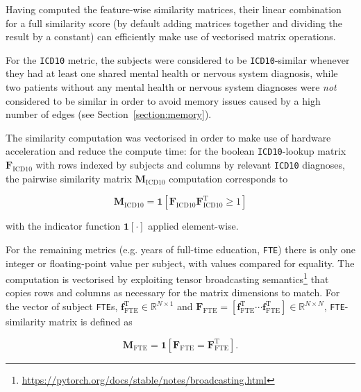 Having computed the feature-wise similarity matrices, their linear combination for a full similarity score (by default adding matrices together and dividing the result by a constant) can efficiently make use of vectorised matrix operations.

For the \texttt{ICD10} metric, the subjects were considered to be \texttt{ICD10}-similar whenever they had at least one shared mental health or nervous system diagnosis, while two patients without any mental health or nervous system diagnoses were \textit{not} considered to be similar in order to avoid memory issues caused by a high number of edges (see Section~\ref{section:memory}). 

The similarity computation was vectorised in order to make use of hardware acceleration and reduce the compute time: for the boolean \texttt{ICD10}-lookup matrix $\mathbf{F}_{\text{ICD10}}$ with rows indexed by subjects and columns by relevant \texttt{ICD10} diagnoses, the pairwise similarity matrix $\mathbf{M}_{\text{ICD10}}$ computation corresponds to 

\begin{equation}
    \mathbf{M}_{\text{ICD10}} = \mathbf{1}\left[\mathbf{F}_{\text{ICD10}}^{\ }\mathbf{F}_{\text{ICD10}}^{\mathrm{T}} \geq 1\right]
\end{equation}

with the indicator function $\mathbf{1}[\cdot]$ applied element-wise.

For the remaining metrics (e.g. years of full-time education, \texttt{FTE}) there is only one integer or floating-point value per subject, with values  compared for equality. The computation is vectorised by exploiting tensor broadcasting semantics\footnote{\url{https://pytorch.org/docs/stable/notes/broadcasting.html}} that copies rows and columns as necessary for the matrix dimensions to match. For the vector of subject \texttt{FTE}s, $\mathbf{f}_{\text{FTE}}^{\mathrm{T}} \in \mathbb{R}^{N \times 1}$ and $\mathbf{F}_{\text{FTE}} = [\mathbf{f}_{\text{FTE}}^{\mathrm{T}} \cdots \mathbf{f}_{\text{FTE}}^{\mathrm{T}}] \in \mathbb{R}^{N \times N}$, \texttt{FTE}-similarity matrix is defined as

\begin{equation}
    \mathbf{M}_{\text{FTE}} = \mathbf{1}\left[\mathbf{F}_{\text{FTE}}^{\ } = \mathbf{F}_{\text{FTE}}^{\mathrm{T}} \right].
\end{equation}



